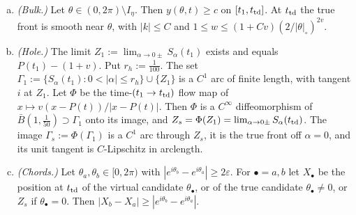 \begin{lemma}\label{lem:B-bulk}
\begin{enumerate}[(a)]\setlength{\itemsep}{1pt}
\item \emph{(Bulk.)} Let $\theta\in(0,2\pi)\setminus I_\eta$. Then $y(\theta,t)\ge c$ on $[t_1,t_{\mathrm{td}}]$. At $t_{\mathrm{td}}$ the true front is
smooth near $\theta$, with $|k|\le C$ and $1\le w\le(1+Cv)(2/|\theta|_\circ)^{2v}$.
\item \emph{(Hole.)} The limit $Z_1:=\lim_{\alpha\to0\pm}S_\alpha(t_1)$ exists and equals $P(t_1)-(1+v)$. Put $r_h:=\frac1{100}$.
The set $\Gamma_1:=\{S_\alpha(t_1):0<|\alpha|\le r_h\}\cup\{Z_1\}$ is a $C^1$ arc of finite length, with tangent $i$ at $Z_1$. Let $\Phi$
be the time-$(t_1\to t_{\mathrm{td}})$ flow map of $x\mapsto v(x-P(t))/|x-P(t)|$. Then $\Phi$ is a $C^\infty$ diffeomorphism of
$\bar B(1,\frac1{50})\supset\Gamma_1$ onto its image, and $Z_s=\Phi(Z_1)=\lim_{\alpha\to0\pm}S_\alpha(t_{\mathrm{td}})$. The image
$\Gamma_s:=\Phi(\Gamma_1)$ is a $C^1$ arc through $Z_s$, it is the true front off $\alpha=0$, and its unit tangent is $C$-Lipschitz in
arclength.
\item \emph{(Chords.)} Let $\theta_a,\theta_b\in[0,2\pi)$ with $|e^{i\theta_b}-e^{i\theta_a}|\ge2\varepsilon$. For $\bullet=a,b$ let $X_\bullet$
be the position at $t_{\mathrm{td}}$ of the virtual candidate $\theta_\bullet$, or of the true candidate $\theta_\bullet\neq0$, or $Z_s$ if
$\theta_\bullet=0$. Then $|X_b-X_a|\ge|e^{i\theta_b}-e^{i\theta_a}|$.
\end{enumerate}
\end{lemma}
